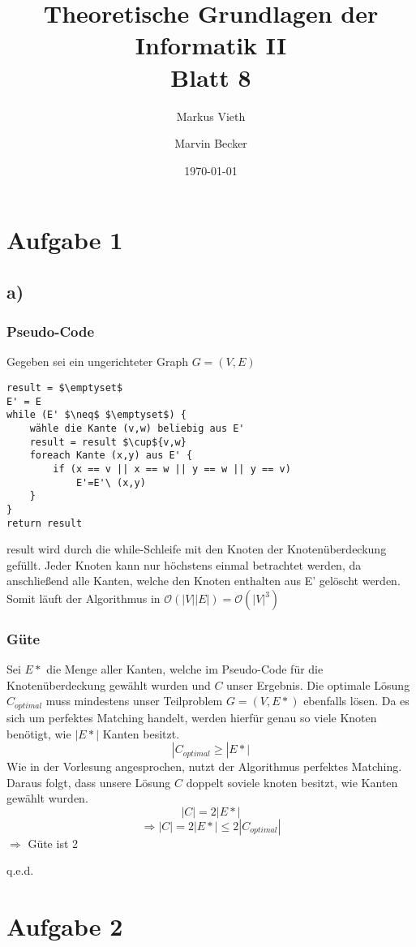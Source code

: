 \documentclass[a4paper,11pt,twoside]{article}
\title{Theoretische Grundlagen der Informatik II\\ Blatt 8}
\author{Markus Vieth \and Marvin Becker}
\date{\today}
\begin{document}
\maketitle
\cleardoublepage
\pagestyle{myheadings}

\section*{Aufgabe 1}
\subsection*{a)}
\subsubsection*{Pseudo-Code}
Gegeben sei ein ungerichteter Graph $G=(V,E)$
\begin{lstlisting}
result = $\emptyset$
E' = E
while (E' $\neq$ $\emptyset$) {
	wähle die Kante (v,w) beliebig aus E'
	result = result $\cup${v,w}
	foreach Kante (x,y) aus E' {
		if (x == v || x == w || y == w || y == v)
			E'=E'\ (x,y)
	}
}
return result
\end{lstlisting}
result wird durch die while-Schleife mit den Knoten der Knotenüberdeckung gefüllt. Jeder Knoten kann nur höchstens einmal betrachtet werden, da anschließend alle Kanten, welche den Knoten enthalten aus E' gelöscht werden. Somit läuft der Algorithmus in $\mathcal{O}(|V||E|) = \mathcal{O}(|V|^3)$\\
\subsubsection*{Güte}
Sei $E*$ die Menge aller Kanten, welche im Pseudo-Code für die Knotenüberdeckung gewählt wurden und $C$ unser Ergebnis. Die optimale Lösung $C_{optimal}$ muss mindestens unser Teilproblem $G=(V, E*)$ ebenfalls lösen. Da es sich um perfektes Matching handelt,  werden hierfür genau so viele Knoten benötigt, wie $|E*|$ Kanten besitzt.
\[ |C_{optimal} \geq |E*| \]
Wie in der Vorlesung angesprochen, nutzt der Algorithmus perfektes Matching. Daraus folgt, dass unsere Lösung $C$ doppelt soviele knoten besitzt, wie Kanten gewählt wurden.
\[ |C| = 2|E*| \]
\[ \Rightarrow |C| = 2|E*| \leq 2|C_{optimal}| \]
$\Rightarrow$ Güte ist 2
\begin{flushright}
	q.e.d.
\end{flushright}
\section*{Aufgabe 2}
\end{document}
